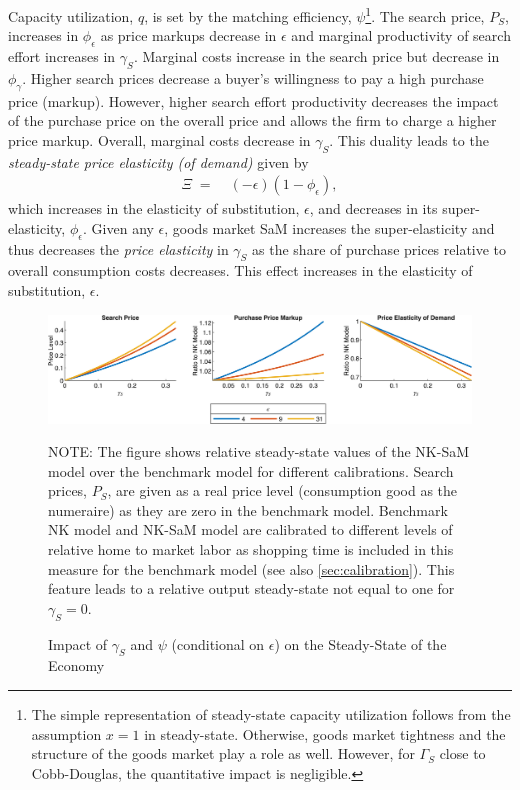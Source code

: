 \documentclass[12pt,3p,authoryear,review]{elsarticle}
\begin{document}
Capacity utilization, $q$, is set by the matching efficiency, $\psi$\footnote{The simple representation of steady-state capacity utilization follows from the assumption $x=1$ in steady-state. Otherwise, goods market tightness and the structure of the goods market play a role as well. However, for $\Gamma_S$ close to Cobb-Douglas, the quantitative impact is negligible.}. The search price, $P_S$, increases in $\phi_\epsilon$ as price markups decrease in $\epsilon$ and marginal productivity of search effort increases in $\gamma_S$. Marginal costs increase in the search price but decrease in $\phi_\gamma$. Higher search prices decrease a buyer's willingness to pay a high purchase price (markup). However, higher search effort productivity decreases the impact of the purchase price on the overall price and allows the firm to charge a higher price markup. Overall, marginal costs decrease in $\gamma_S$. This duality leads to the \emph{steady-state price elasticity (of demand)} given by%
\begin{align}%
	\Xi \; = & \; \left(-\epsilon\right)\left(1-\phi_\epsilon\right),\label{stst:price_elasticity}%
\end{align}%
which increases in the elasticity of substitution, $\epsilon$, and decreases in its super-elasticity, $\phi_\epsilon$. Given any $\epsilon$, goods market SaM increases the super-elasticity and thus decreases the \emph{price elasticity} in $\gamma_S$ as the share of purchase prices relative to overall consumption costs decreases. This effect increases in the elasticity of substitution, $\epsilon$.\\%
\begin{figure}[t]%
	\centering%
	\caption{Impact of $\gamma_S$ and $\psi$ (conditional on $\epsilon$) on the Steady-State of the Economy}\label{fig:stst_eps_gamES}%
	\includegraphics[width=\textwidth]{fig_1_stst_ps_mp.png}\\%
	{\tiny \singlespacing NOTE: The figure shows relative steady-state values of the NK-SaM model over the benchmark model for different calibrations. Search prices, $P_S$, are given as a real price level (consumption good as the numeraire) as they are zero in the benchmark model. Benchmark NK model and NK-SaM model are calibrated to different levels of relative home to market labor as shopping time is included in this measure for the benchmark model (see also \cref{sec:calibration}). This feature leads to a relative output steady-state not equal to one for $\gamma_S=0$.\par}%
\end{figure}%
\end{document}
